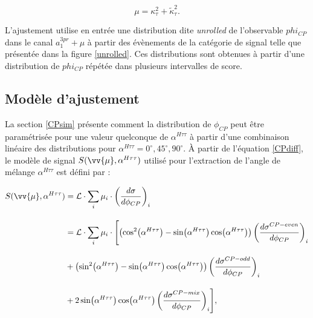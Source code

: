 \begin{equation}
  \mu=\kappa_{\tau}^2+\tilde{\kappa}_{\tau}^2.
\end{equation}

L'ajustement utilise en entrée une distribution dite \textit{unrolled} de l'observable $phi_{CP}$ dans le canal $a_1^{3pr}+\mu$ à partir des évènements de la catégorie de signal telle que présentée dans la figure \ref{unrolled}. Ces distributions sont obtenues à partir d'une distribution de $phi_{CP}$ répétée dans plusieurs intervalles de score. 

\subsection{Modèle d'ajustement}

La section \ref{CPsim} présente comment la distribution de $\phi_{CP}$ peut être paramétrisée pour une valeur quelconque de $\alpha^{H\tau\tau}$ à partir d'une combinaison linéaire des distributions pour $\alpha^{H\tau\tau}=0^\circ,45^\circ,90^\circ$. À partir de l'équation \ref{CPdiff}, le modèle de signal $S(\vv{\mu},\alpha^{H\tau\tau})$ utilisé pour l'extraction de l'angle de mélange $\alpha^{H\tau\tau}$ est défini par :

\begin{align}
    S(\vv{\mu},\alpha^{H\tau\tau}) & =\mathcal{L}\cdot\sum_{i}\mu_i\cdot\left(\frac{d\sigma}{d\phi_{CP}}\right)_i \nonumber \\[1em]
     & =\mathcal{L}\cdot\sum_{i}\mu_i\cdot \Biggl[\bigl(\cos^2\bigl(\alpha^{H\tau\tau}\bigr)-\sin\bigl(\alpha^{H\tau\tau}\bigr)\cos\bigl(\alpha^{H\tau\tau}\bigr)\bigr)\left(\frac{d\sigma^{CP-even}}{d\phi_{CP}}\right)_i \nonumber \\[1em] 
     & + \bigl(\sin^2\bigl(\alpha^{H\tau\tau}\bigr)-\sin\bigl(\alpha^{H\tau\tau}\bigr)\cos\bigl(\alpha^{H\tau\tau}\bigr)\bigr)\left(\frac{d\sigma^{CP-odd}}{d\phi_{CP}}\right)_i \nonumber \\[1em] 
     & + 2\sin\bigl(\alpha^{H\tau\tau}\bigr)\cos\bigl(\alpha^{H\tau\tau}\bigr)\left(\frac{d\sigma^{CP-mix}}{d\phi_{CP}}\right)_i\Biggr],
\end{align}

